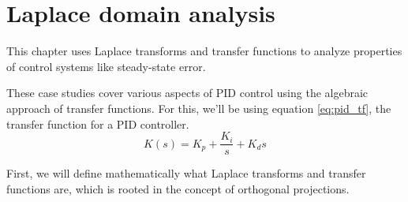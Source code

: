 
\chapter{Laplace domain analysis}
\label{ch:laplace-domain-analysis}

This chapter uses Laplace transforms and transfer functions to analyze
properties of control systems like \gls{steady-state error}.

These case studies cover various aspects of PID control using the algebraic
approach of transfer functions. For this, we'll be using equation
\eqref{eq:pid_tf}, the transfer function for a PID controller.
\begin{equation}
  K(s) = K_p + \frac{K_i}{s} + K_ds \label{eq:pid_tf}
\end{equation}

First, we will define mathematically what Laplace transforms and transfer
functions are, which is rooted in the concept of orthogonal projections.

\renewcommand*{\chapterpath}{\partpath/laplace-domain-analysis}







